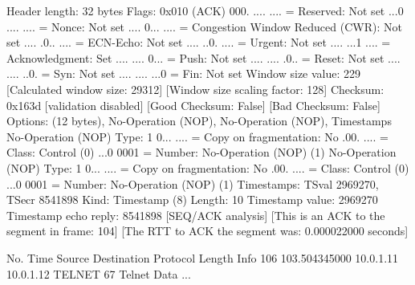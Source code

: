     Header length: 32 bytes
    Flags: 0x010 (ACK)
        000. .... .... = Reserved: Not set
        ...0 .... .... = Nonce: Not set
        .... 0... .... = Congestion Window Reduced (CWR): Not set
        .... .0.. .... = ECN-Echo: Not set
        .... ..0. .... = Urgent: Not set
        .... ...1 .... = Acknowledgment: Set
        .... .... 0... = Push: Not set
        .... .... .0.. = Reset: Not set
        .... .... ..0. = Syn: Not set
        .... .... ...0 = Fin: Not set
    Window size value: 229
    [Calculated window size: 29312]
    [Window size scaling factor: 128]
    Checksum: 0x163d [validation disabled]
        [Good Checksum: False]
        [Bad Checksum: False]
    Options: (12 bytes), No-Operation (NOP), No-Operation (NOP), Timestamps
        No-Operation (NOP)
            Type: 1
                0... .... = Copy on fragmentation: No
                .00. .... = Class: Control (0)
                ...0 0001 = Number: No-Operation (NOP) (1)
        No-Operation (NOP)
            Type: 1
                0... .... = Copy on fragmentation: No
                .00. .... = Class: Control (0)
                ...0 0001 = Number: No-Operation (NOP) (1)
        Timestamps: TSval 2969270, TSecr 8541898
            Kind: Timestamp (8)
            Length: 10
            Timestamp value: 2969270
            Timestamp echo reply: 8541898
    [SEQ/ACK analysis]
        [This is an ACK to the segment in frame: 104]
        [The RTT to ACK the segment was: 0.000022000 seconds]

No.     Time           Source                Destination           Protocol Length Info
    106 103.504345000  10.0.1.11             10.0.1.12             TELNET   67     Telnet Data ...


